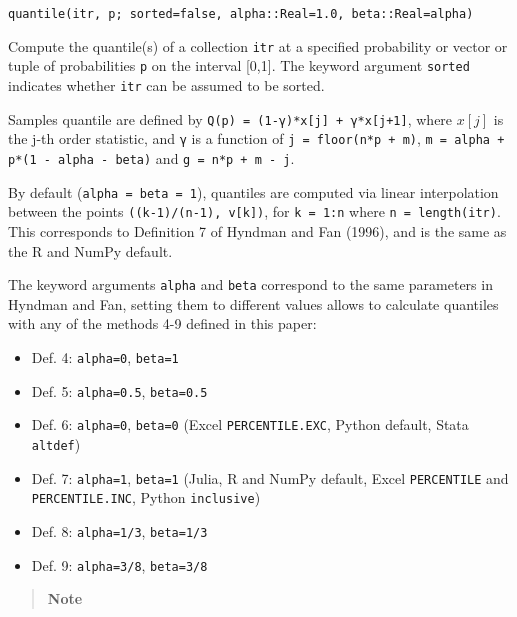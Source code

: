 \begin{adjustwidth}{2em}{0pt}


\begin{verbatim}
quantile(itr, p; sorted=false, alpha::Real=1.0, beta::Real=alpha)
\end{verbatim}

Compute the quantile(s) of a collection \texttt{itr} at a specified probability or vector or tuple of probabilities \texttt{p} on the interval [0,1]. The keyword argument \texttt{sorted} indicates whether \texttt{itr} can be assumed to be sorted.

Samples quantile are defined by \texttt{Q(p) = (1-γ)*x[j] + γ*x[j+1]}, where  \(x[j]\)  is the j-th order statistic, and \texttt{γ} is a function of \texttt{j = floor(n*p + m)}, \texttt{m = alpha + p*(1 - alpha - beta)} and \texttt{g = n*p + m - j}.

By default (\texttt{alpha = beta = 1}), quantiles are computed via linear interpolation between the points \texttt{((k-1)/(n-1), v[k])}, for \texttt{k = 1:n} where \texttt{n = length(itr)}. This corresponds to Definition 7 of Hyndman and Fan (1996), and is the same as the R and NumPy default.

The keyword arguments \texttt{alpha} and \texttt{beta} correspond to the same parameters in Hyndman and Fan, setting them to different values allows to calculate quantiles with any of the methods 4-9 defined in this paper:

\begin{itemize}
\item Def. 4: \texttt{alpha=0}, \texttt{beta=1}


\item Def. 5: \texttt{alpha=0.5}, \texttt{beta=0.5}


\item Def. 6: \texttt{alpha=0}, \texttt{beta=0} (Excel \texttt{PERCENTILE.EXC}, Python default, Stata \texttt{altdef})


\item Def. 7: \texttt{alpha=1}, \texttt{beta=1} (Julia, R and NumPy default, Excel \texttt{PERCENTILE} and \texttt{PERCENTILE.INC}, Python \texttt{{\textquotesingle}inclusive{\textquotesingle}})


\item Def. 8: \texttt{alpha=1/3}, \texttt{beta=1/3}


\item Def. 9: \texttt{alpha=3/8}, \texttt{beta=3/8}

\end{itemize}
\begin{quote}
\textbf{Note}


\end{quote}
\end{adjustwidth}
